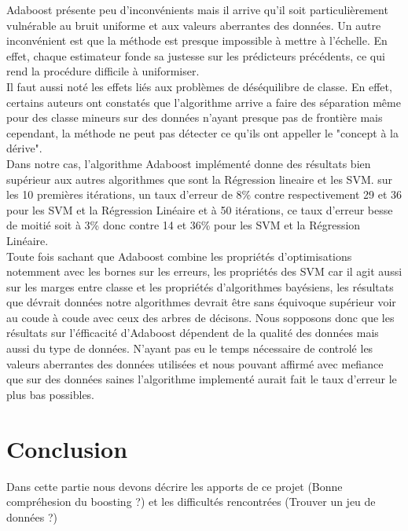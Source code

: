 \documentclass{article}
\begin{document}
Adaboost présente  peu d'inconvénients mais il arrive qu'il soit particulièrement vulnérable au bruit uniforme et aux valeurs aberrantes des données\cite{educba}. 
Un autre inconvénient est que la méthode est presque impossible à mettre à l'échelle. En effet, chaque estimateur fonde sa justesse sur les prédicteurs précédents, ce qui rend la procédure difficile à uniformiser\cite{corporatefinanceinstitute}.\\

Il faut aussi noté les effets liés aux problèmes de déséquilibre de classe\cite{Longadage-2013}. En effet, certains auteurs ont constatés que l'algorithme arrive a faire des séparation même pour des classe mineurs sur des données n'ayant presque pas de frontière mais cependant, la méthode ne peut pas détecter  ce qu'ils ont appeller le "concept à la dérive".\\

Dans notre cas, l'algorithme Adaboost implémenté donne des résultats bien supérieur aux autres algorithmes que sont la Régression lineaire et les SVM. sur les 10 premières itérations, un taux d'erreur de 8\% contre respectivement 29 et 36 pour les SVM et la Régression Linéaire et à 50 itérations, ce taux d'erreur besse de moitié soit à 3\% donc contre 14 et 36\% pour les SVM et la Régression Linéaire.\\
Toute fois sachant que Adaboost combine les propriétés d'optimisations notemment avec les bornes sur les erreurs, les propriétés des SVM car il agit aussi sur les marges entre classe et les propriétés d'algorithmes bayésiens, les résultats que dévrait données notre algorithmes devrait être sans équivoque supérieur voir au coude à coude avec ceux des arbres de décisons. Nous sopposons donc que les résultats sur l'éfficacité d'Adaboost dépendent de la qualité des données mais aussi du type de données. N'ayant pas eu le temps nécessaire de controlé les valeurs aberrantes des données utilisées et nous pouvant affirmé avec mefiance que sur des données saines l'algorithme implementé aurait fait le taux d'erreur le plus bas possibles.

\section{Conclusion}
Dans cette partie nous devons décrire les apports de ce projet (Bonne compréhesion du boosting ?) et les difficultés rencontrées (Trouver un jeu de données ?)



\end{document}
